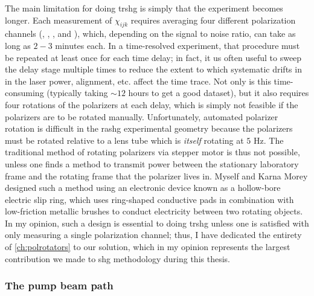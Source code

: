 The main limitation for doing \gls{trshg} is simply that the experiment becomes longer.
Each measurement of $\chi_{ijk}$ requires averaging four different polarization channels (\PP, \PS, \SP, and \SS), which, depending on the signal to noise ratio, can take as long as $2-3$ minutes each.
In a time-resolved experiment, that procedure must be repeated at least once for each time delay; in fact, it us often useful to sweep the delay stage multiple times to reduce the extent to which systematic drifts in in the laser power, alignment, etc. affect the time trace.
Not only is this time-consuming (typically taking $\sim 12$ \si{hours} to get a good dataset), but it also requires four rotations of the polarizers at each delay, which is simply not feasible if the polarizers are to be rotated manually.
Unfortunately, automated polarizer rotation is difficult in the \gls{rashg} experimental geometry because the polarizers must be rotated relative to a lens tube which is \emph{itself} rotating at $5$ \si{Hz}.
The traditional method of rotating polarizers via stepper motor is thus not possible, unless one finds a method to transmit power between the stationary laboratory frame and the rotating frame that the polarizer lives in.
Myself and Karna Morey designed such a method using an electronic device known as a hollow-bore electric slip ring, which uses ring-shaped conductive pads in combination with low-friction metallic brushes to conduct electricity between two rotating objects.
In my opinion, such a design is essential to doing \gls{trshg} unless one is satisfied with only measuring a single polarization channel; thus, I have dedicated the entirety of \cref{ch:polrotators} to our solution, which in my opinion represents the largest contribution we made to \gls{shg} methodology during this thesis.

\subsubsection{The pump beam path}

